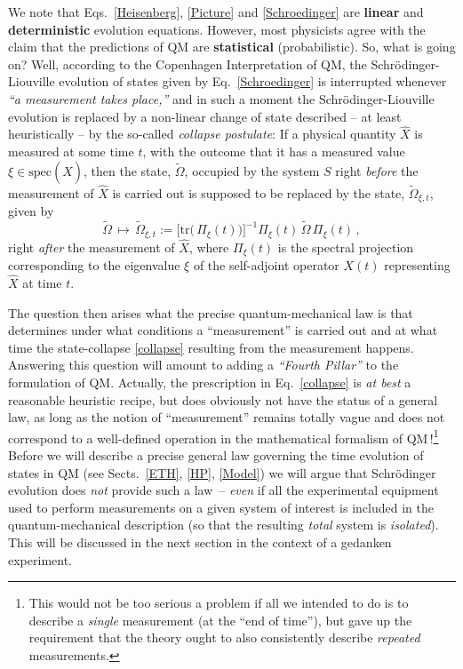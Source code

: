 \documentclass[12pt]{article}
\begin{document}
We note that Eqs.~\eqref{Heisenberg}, \eqref{Picture} and \eqref{Schroedinger} are {\bf{linear}} and {\bf{deterministic}}
evolution equations.
However, most physicists agree with the claim that the predictions of QM are {\bf{statistical}} (probabilistic). So, what is
going on? Well, according to the Copenhagen Interpretation of QM, the Schr\"odinger-Liouville evolution of states given
by Eq.~\eqref{Schroedinger} is interrupted whenever  \textit{``a measurement takes place,''} and in such a moment
the Schr\"odinger-Liouville evolution is replaced by a non-linear change of state described -- at least heuristically  --
by the so-called \textit{collapse postulate}: If a physical quantity $\hat{X}$ is measured at some time $t$, with the outcome
 that it has a measured value $\xi \in \text{spec}(\hat{X})$, then the state, $\widetilde{\Omega}$, occupied by the system
 $S$ right \textit{before} the measurement of $\hat{X}$ is carried out is supposed to be replaced by the state,
 $\widetilde{\Omega}_{\xi, t}$, given by
\begin{equation}\label{collapse}
\widetilde{\Omega} \,\mapsto\,  \widetilde{\Omega}_{\xi, t} := \big[\text{tr}\big(\,\Pi_{\xi}(t)\big)\big]^{-1} \Pi_{\xi}(t)\,
\widetilde{\Omega}\, \Pi_{\xi}(t)\,,
\end{equation}
right \textit{after} the measurement of $\hat{X}$, where $\Pi_{\xi}(t)$ is the spectral projection corresponding to the eigenvalue $\xi$ of the self-adjoint operator $X(t)$ representing $\hat{X}$ at time $t$.

The question then arises what the precise quantum-mechanical law is that determines under what conditions a ``measurement'' is carried out and at what time the state-collapse \eqref{collapse} resulting from the measurement happens.
Answering this question will amount to adding a \textit{``Fourth Pillar''} to the formulation of QM. Actually, the prescription
in Eq.~\eqref{collapse} is \textit{at best} a reasonable heuristic recipe, but does obviously not have the status of a general law,
as long as the notion of ``measurement'' remains totally vague and does not correspond to a well-defined operation in
the mathematical formalism of QM\,!\footnote{This would not be too serious a problem if all we intended to do is to describe
a \textit{single} measurement (at the ``end of time''), but gave up the requirement that the theory ought to also consistently
describe \textit{repeated} measurements.} Before we will describe a precise general law governing the time evolution
of states in QM (see Sects.~\ref{ETH}, \ref{HP}, \ref{Model}) we will argue that Schr\"odinger evolution does \textit{not}
provide such a \mbox{law --} \textit{even} if all the experimental equipment used to perform measurements on a given
system of interest is included in the quantum-mechanical description (so that the resulting \textit{total} system is \textit{isolated}). This will be discussed in the next section in the context of a gedanken experiment.
\newpage
\end{document}
